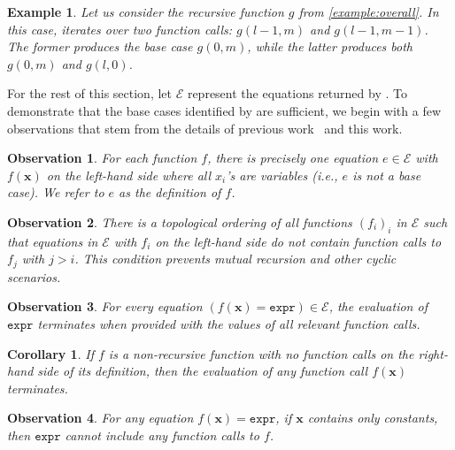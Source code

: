 \documentclass{article}
\newtheorem{fact}{Observation}
\newtheorem{corollary}{Corollary}
\newtheorem{example}{Example}
\theoremstyle{remark}
\newcommand{\expr}{\mathtt{expr}}
\begin{document}
\begin{example}
  Let us consider the recursive function $g$ from \cref{example:overall}. In
  this case, \FindBaseCases iterates over two function calls: $g(l-1, m)$ and
  $g(l-1, m-1)$. The former produces the base case $g(0, m)$, while the latter
  produces both $g(0, m)$ and $g(l, 0)$.
\end{example}

For the rest of this section, let $\mathcal{E}$ represent the equations returned
by \CompileWithBaseCases. To demonstrate that the base cases identified by
\FindBaseCases are sufficient, we begin with a few observations that stem from
the details of previous
work~\cite{DBLP:conf/ijcai/BroeckTMDR11,DBLP:conf/kr/DilkasB23} and this work.

\begin{fact}\label{assumption1}
  For each function $f$, there is precisely one equation $e \in \mathcal{E}$
  with $f(\mathbf{x})$ on the left-hand side where all $x_{i}$'s are variables
  (i.e., $e$ is not a base case). We refer to $e$ as the \emph{definition} of
  $f$.
\end{fact}

\begin{fact}\label{assumption2}
  There is a \emph{topological ordering} of all functions ${(f_{i})}_{i}$ in
  $\mathcal{E}$ such that equations in $\mathcal{E}$ with $f_{i}$ on the
  left-hand side do not contain function calls to $f_{j}$ with $j > i$. This
  condition prevents mutual recursion and other cyclic scenarios.
\end{fact}

\begin{fact}\label{assumption3}
  For every equation $(f(\mathbf{x}) = \expr) \in \mathcal{E}$, the evaluation
  of $\expr$ terminates when provided with the values of all relevant function
  calls.
\end{fact}

\begin{corollary}\label{fact}
  If $f$ is a non-recursive function with no function calls on the right-hand
  side of its definition, then the evaluation of any function call
  $f(\mathbf{x})$ terminates.
\end{corollary}

\begin{fact}\label{fact2}
  For any equation $f(\mathbf{x}) = \expr{}$, if $\mathbf{x}$ contains only
  constants, then $\expr{}$ cannot include any function calls to $f$.
\end{fact}
\end{document}
